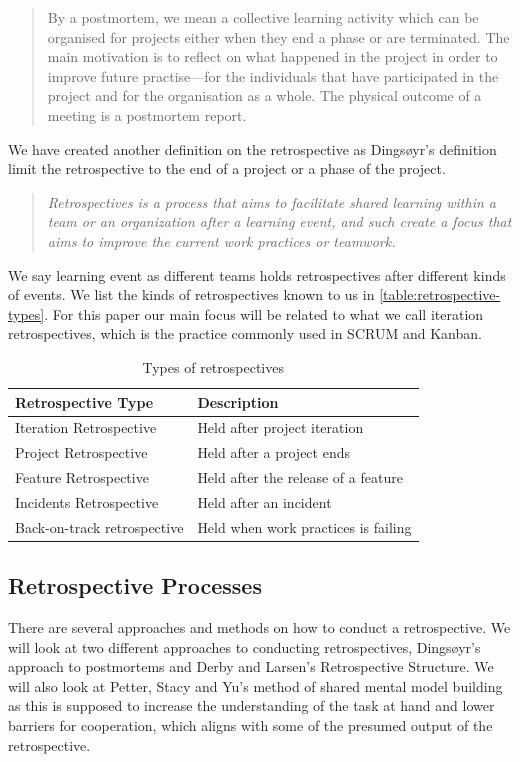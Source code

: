 \begin{quote}
By a postmortem, we mean a collective learning activity which
can be organised for projects either when they end a phase or
are terminated. The main motivation is to reflect on what happened
in the project in order to improve future practise—for the
individuals that have participated in the project and for the organisation
as a whole. The physical outcome of a meeting is a
postmortem report.
\end{quote}

We have created another definition on the retrospective as Dingsøyr's definition limit the retrospective to the end of a project or a phase of the project. 

\begin{quote}
	\textit{Retrospectives is a process that aims to facilitate shared learning within a team or an organization after a learning event, and such create a focus that aims to improve the current work practices or teamwork.}
\end{quote}

We say learning event as different teams holds retrospectives after different kinds of events. We list the kinds of retrospectives known to us in \autoref{table:retrospective-types}. For this paper our main focus will be related to what we call iteration retrospectives, which is the practice commonly used in SCRUM and Kanban. 

\begin{table}[h]
	\begin{center}
		\caption{Types of retrospectives}
		\label{table:retrospective-types}
		\begin{tabular}{l l}
			\hline
			Retrospective Type & Description \\
			\hline
			Iteration Retrospective & Held after project iteration \\
			Project Retrospective & Held after a project ends \\
			Feature Retrospective & Held after the release of a feature \\
			Incidents Retrospective & Held after an incident \\
			Back-on-track retrospective & Held when work practices is failing \\
			\hline
		\end{tabular}
	\end{center}
\end{table}

\subsection{Retrospective Processes}
There are several approaches and methods on how to conduct a retrospective. We will look at two different approaches to conducting retrospectives, Dingsøyr's \cite{Dingsoyr2004} approach to postmortems and Derby and Larsen's Retrospective Structure. We will also look at Petter, Stacy and Yu's method of shared mental model building as this is supposed to increase the understanding of the task at hand and lower barriers for cooperation, which aligns with some of the presumed output of the retrospective. 

